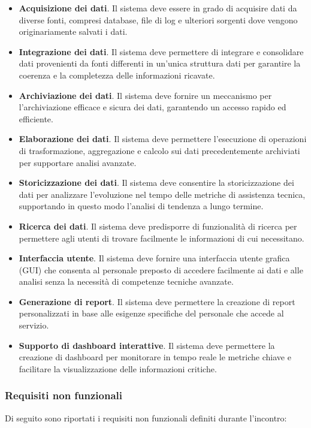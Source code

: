 \begin{itemize}
    \item \textbf{Acquisizione dei dati}. Il sistema deve essere in grado di acquisire dati da diverse fonti, compresi database, file di log e ulteriori sorgenti dove vengono originariamente salvati i dati.
    \item \textbf{Integrazione dei dati}. Il sistema deve permettere di integrare e consolidare dati provenienti da fonti differenti in un'unica struttura dati per garantire la coerenza e la completezza delle informazioni ricavate.
    \item \textbf{Archiviazione dei dati}. Il sistema deve fornire un meccanismo per l'archiviazione efficace e sicura dei dati, garantendo un accesso rapido ed efficiente.
    \item \textbf{Elaborazione dei dati}. Il sistema deve permettere l'esecuzione di operazioni di trasformazione, aggregazione e calcolo sui dati precedentemente archiviati per supportare analisi avanzate.
    \item \textbf{Storicizzazione dei dati}. Il sistema deve consentire la storicizzazione dei dati per analizzare l'evoluzione nel tempo delle metriche di assistenza tecnica, supportando in questo modo l'analisi di tendenza a lungo termine.
    \item \textbf{Ricerca dei dati}. Il sistema deve predisporre di funzionalità di ricerca per permettere agli utenti di trovare facilmente le informazioni di cui necessitano.
    \item \textbf{Interfaccia utente}. Il sistema deve fornire una interfaccia utente grafica (GUI) che consenta al personale preposto di accedere facilmente ai dati e alle analisi senza la necessità di competenze tecniche avanzate.
    \item \textbf{Generazione di report}. Il sistema deve permettere la creazione di report personalizzati in base alle esigenze specifiche del personale che accede al servizio.
    \item \textbf{Supporto di dashboard interattive}. Il sistema deve permettere la creazione di dashboard per monitorare in tempo reale le metriche chiave e facilitare la visualizzazione delle informazioni critiche.
\end{itemize}

\subsubsection{Requisiti non funzionali}
Di seguito sono riportati i requisiti non funzionali definiti durante l'incontro:

